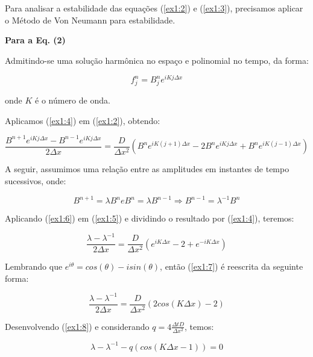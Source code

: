 \documentclass[11pt]{article}
\begin{document}
Para analisar a estabilidade das equações (\ref{ex1:2}) e (\ref{ex1:3}),
precisamos aplicar o Método de Von Neumann para estabilidade.

\textbf{Para a Eq. (2)}

Admitindo-se uma solução harmônica no espaço e polinomial no tempo, da
forma:

\begin{equation}
    f^{n}_{j} = B^{n}_{j}e^{iKj\Delta{x}}
    \label{ex1:4}
\end{equation}

onde \(K\) é o número de onda.

Aplicamos (\ref{ex1:4}) em (\ref{ex1:2}), obtendo:

\begin{equation}
    \frac{B^{n+1}e^{iKj\Delta{x}} - B^{n-1}e^{iKj\Delta{x}} }{2\Delta{x}} = \frac{D}{\Delta{x^2}}(B^{n}e^{iK(j+1)\Delta{x}} - 2B^{n}e^{iKj\Delta{x}} + B^{n}e^{iK(j-1)\Delta{x}})
    \label{ex1:5}
\end{equation}

A seguir, assumimos uma relação entre as amplitudes em instantes de
tempo sucessivos, onde:

\begin{equation}
    B^{n+1} = \lambda B^{n} e B^{n} = \lambda B^{n-1} \Rightarrow B^{n-1} = \lambda^{-1}B^n
    \label{ex1:6}
\end{equation}

Aplicando (\ref{ex1:6}) em (\ref{ex1:5}) e dividindo o resultado por
(\ref{ex1:4}), teremos:

\begin{equation}
    \frac{\lambda - \lambda^{-1}}{2\Delta{x}} = \frac{D}{\Delta{x^2}}(e^{iK\Delta{x}} - 2 + e^{-iK\Delta{x}})
    \label{ex1:7}
\end{equation}

Lembrando que \(e^{i\theta} = cos(\theta) - isin(\theta)\), então
(\ref{ex1:7}) é reescrita da seguinte forma:

\begin{equation}
    \frac{\lambda - \lambda^{-1}}{2\Delta{x}} = \frac{D}{\Delta{x^2}}(2cos(K\Delta{x}) - 2)
    \label{ex1:8}
\end{equation}

Desenvolvendo (\ref{ex1:8}) e considerando
\(q = 4\frac{\Delta{t}D}{\Delta{x^2}}\), temos:

\begin{equation}
    \lambda - \lambda^{-1} - q(cos(K\Delta{x} -1)) = 0
    \label{ex1:9}
\end{equation}
\end{document}
